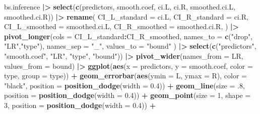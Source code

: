 \documentclass[
]{article}
\newenvironment{Shaded}{\begin{snugshade}}{\end{snugshade}}
\newcommand{\AttributeTok}[1]{\textcolor[rgb]{0.13,0.29,0.53}{#1}}
\newcommand{\DecValTok}[1]{\textcolor[rgb]{0.00,0.00,0.81}{#1}}
\newcommand{\FloatTok}[1]{\textcolor[rgb]{0.00,0.00,0.81}{#1}}
\newcommand{\FunctionTok}[1]{\textcolor[rgb]{0.13,0.29,0.53}{\textbf{#1}}}
\newcommand{\NormalTok}[1]{#1}
\newcommand{\SpecialCharTok}[1]{\textcolor[rgb]{0.81,0.36,0.00}{\textbf{#1}}}
\newcommand{\StringTok}[1]{\textcolor[rgb]{0.31,0.60,0.02}{#1}}
\begin{document}
\begin{Shaded}
\begin{Highlighting}[]
\NormalTok{bs.inference }\SpecialCharTok{|\textgreater{}} 
    \FunctionTok{select}\NormalTok{(}\FunctionTok{c}\NormalTok{(predictors, smooth.coef, ci.L, ci.R, smoothed.ci.L, smoothed.ci.R)) }\SpecialCharTok{|\textgreater{}} 
    \FunctionTok{rename}\NormalTok{(}
        \AttributeTok{CI\_L\_standard =}\NormalTok{ ci.L,}
        \AttributeTok{CI\_R\_standard =}\NormalTok{ ci.R,}
        \AttributeTok{CI\_L\_smoothed =}\NormalTok{ smoothed.ci.L,}
        \AttributeTok{CI\_R\_smoothed =}\NormalTok{ smoothed.ci.R,}
\NormalTok{    ) }\SpecialCharTok{|\textgreater{}} 
    \FunctionTok{pivot\_longer}\NormalTok{(}\AttributeTok{cols =}\NormalTok{ CI\_L\_standard}\SpecialCharTok{:}\NormalTok{CI\_R\_smoothed, }
                 \AttributeTok{names\_to =} \FunctionTok{c}\NormalTok{(}\StringTok{"drop"}\NormalTok{, }\StringTok{"LR"}\NormalTok{,}\StringTok{"type"}\NormalTok{), }
                 \AttributeTok{names\_sep =} \StringTok{"\_"}\NormalTok{,}
                 \AttributeTok{values\_to =} \StringTok{"bound"}\NormalTok{ ) }\SpecialCharTok{|\textgreater{}} 
    \FunctionTok{select}\NormalTok{(}\FunctionTok{c}\NormalTok{(}\StringTok{"predictors"}\NormalTok{, }\StringTok{"smooth.coef"}\NormalTok{, }\StringTok{"LR"}\NormalTok{, }\StringTok{"type"}\NormalTok{, }\StringTok{"bound"}\NormalTok{)) }\SpecialCharTok{|\textgreater{}} 
    \FunctionTok{pivot\_wider}\NormalTok{(}\AttributeTok{names\_from =}\NormalTok{ LR, }\AttributeTok{values\_from =}\NormalTok{ bound) }\SpecialCharTok{|\textgreater{}} 
    \FunctionTok{ggplot}\NormalTok{(}\FunctionTok{aes}\NormalTok{(}\AttributeTok{x =}\NormalTok{ predictors, }\AttributeTok{y =}\NormalTok{ smooth.coef, }\AttributeTok{color =}\NormalTok{ type, }\AttributeTok{group =}\NormalTok{ type)) }\SpecialCharTok{+} 
    \FunctionTok{geom\_errorbar}\NormalTok{(}\FunctionTok{aes}\NormalTok{(}\AttributeTok{ymin =}\NormalTok{ L, }\AttributeTok{ymax =}\NormalTok{ R), }\AttributeTok{color =} \StringTok{"black"}\NormalTok{, }\AttributeTok{position =} \FunctionTok{position\_dodge}\NormalTok{(}\AttributeTok{width =} \FloatTok{0.4}\NormalTok{)) }\SpecialCharTok{+}
    \FunctionTok{geom\_line}\NormalTok{(}\AttributeTok{size =}\NormalTok{ .}\DecValTok{8}\NormalTok{, }\AttributeTok{position =} \FunctionTok{position\_dodge}\NormalTok{(}\AttributeTok{width =} \FloatTok{0.4}\NormalTok{)) }\SpecialCharTok{+}
    \FunctionTok{geom\_point}\NormalTok{(}\AttributeTok{size =} \DecValTok{1}\NormalTok{, }\AttributeTok{shape =} \DecValTok{3}\NormalTok{, }\AttributeTok{position =} \FunctionTok{position\_dodge}\NormalTok{(}\AttributeTok{width =} \FloatTok{0.4}\NormalTok{)) }\SpecialCharTok{+}

\end{Highlighting}
\end{Shaded}
\end{document}
